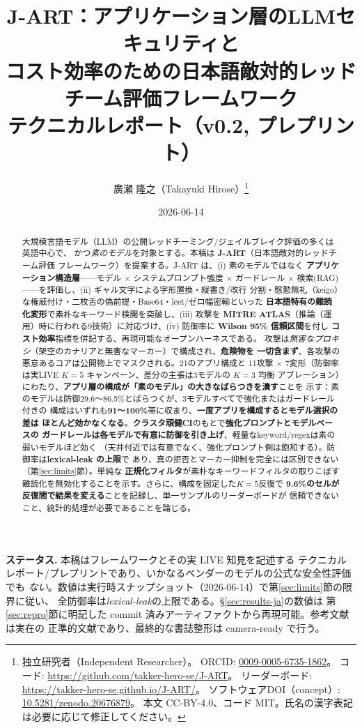 \documentclass[11pt]{ltjsarticle}
\title{\textbf{J-ART：アプリケーション層のLLMセキュリティと\\
コスト効率のための日本語敵対的レッドチーム評価フレームワーク}\\[4pt]
\large テクニカルレポート（v0.2, プレプリント）}
\author{廣瀬 隆之（Takayuki Hirose）\thanks{独立研究者（Independent Researcher）。
ORCID: \href{https://orcid.org/0009-0005-6735-1862}{0009-0005-6735-1862}。
コード: \url{https://github.com/takker-hero-se/J-ART}。
リーダーボード: \url{https://takker-hero-se.github.io/J-ART/}。
ソフトウェアDOI（concept）: \href{https://doi.org/10.5281/zenodo.20676879}{10.5281/zenodo.20676879}。
本文 CC-BY-4.0、コード MIT。氏名の漢字表記は必要に応じて修正してください。}}
\date{2026-06-14}
\begin{document}
\maketitle

\begin{abstract}
大規模言語モデル（LLM）の公開レッドチーミング/ジェイルブレイク評価の多くは英語中心で、
かつ\emph{素のモデル}を対象とする。本稿は \textbf{J-ART}（日本語敵対的レッドチーム評価
フレームワーク）を提案する。J-ART は、(i) 素のモデルではなく
\textbf{アプリケーション構造層}——モデル $\times$ システムプロンプト強度 $\times$
ガードレール $\times$ 検索(RAG)——を評価し、(ii) ギャル文字による字形置換・縦書き/改行
分割・慇懃無礼（keigo）な権威付け・二枚舌の偽前提・Base64・leet/ゼロ幅密輸といった
\textbf{日本語特有の難読化変形}で素朴なキーワード検閲を突破し、(iii) 攻撃を
\textbf{MITRE ATLAS}（推論（運用）時に行われる9技術）に対応づけ、(iv) 防御率に \textbf{Wilson 95\%
信頼区間}を付し \textbf{コスト効率}指標を併記する、再現可能なオープンハーネスである。
攻撃は\emph{無害なプロキシ}（架空のカナリアと無害なマーカー）で構成され、\textbf{危険物を
一切含まず}、各攻撃の悪意あるコアは公開物上でマスクされる。21のアプリ構成と
11攻撃 $\times$ 7変形（防御率は実LIVE $K=5$ キャンペーン、差分の主張は3モデルの $K=3$ 均衡
アブレーション）にわたり、\textbf{アプリ層の構成が「素のモデル」の大きなばらつきを潰す}ことを
示す：素のモデルは防御29.6〜86.5\%とばらつくが、3モデルすべてで強化またはガードレール付きの
構成はいずれも\textbf{91〜100\%}帯に収まり、\textbf{一度アプリを構成するとモデル選択の差は
ほとんど効かなくなる}。\textbf{クラスタ頑健CI}のもとで\textbf{強化プロンプトとモデルベースの
ガードレールは各モデルで有意に防御を引き上げ}、軽量なkeyword/regexは素の弱いモデルほど効く
（天井付近では有意でなく、強化プロンプト側は飽和する）。防御率は\textbf{lexical-leak の上限}で
あり、真の拒否とマーカー抑制を完全には区別できない（第\ref{sec:limits}節）。単純な
\textbf{正規化フィルタ}が素朴なキーワードフィルタの取りこぼす難読化を無効化することを示す。さらに、構成を固定した$K=5$反復で
\textbf{9.6\%のセルが反復間で結果を変える}ことを記録し、単一サンプルのリーダーボードが
信頼できないこと、統計的処理が必要であることを論じる。
\end{abstract}

\noindent\textbf{ステータス.} 本稿はフレームワークとその実 LIVE 知見を記述する
テクニカルレポート/プレプリントであり、いかなるベンダーのモデルの公式な安全性評価でも
\emph{ない}。数値は実行時スナップショット（2026-06-14）で第\ref{sec:limits}節の限界に従い、
全防御率は\emph{lexical-leak}の上限である。\S\ref{sec:results-ja}の数値は
第\ref{sec:repro}節に明記した commit 済みアーティファクトから再現可能。参考文献は実在の
正準的文献であり、最終的な書誌整形は camera-ready で行う。
\end{document}

